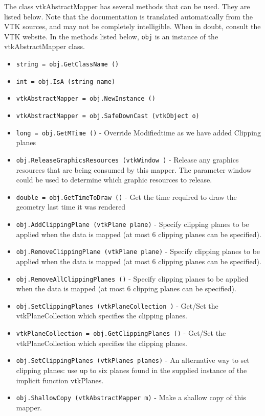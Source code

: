 The class vtkAbstractMapper has several methods that can be used.
  They are listed below.
Note that the documentation is translated automatically from the VTK sources,
and may not be completely intelligible.  When in doubt, consult the VTK website.
In the methods listed below, \verb|obj| is an instance of the vtkAbstractMapper class.
\begin{itemize}
\item  \verb|string = obj.GetClassName ()|

\item  \verb|int = obj.IsA (string name)|

\item  \verb|vtkAbstractMapper = obj.NewInstance ()|

\item  \verb|vtkAbstractMapper = obj.SafeDownCast (vtkObject o)|

\item  \verb|long = obj.GetMTime ()| -  Override Modifiedtime as we have added Clipping planes

\item  \verb|obj.ReleaseGraphicsResources (vtkWindow )| -  Release any graphics resources that are being consumed by this mapper.
 The parameter window could be used to determine which graphic
 resources to release.

\item  \verb|double = obj.GetTimeToDraw ()| -  Get the time required to draw the geometry last time it was rendered

\item  \verb|obj.AddClippingPlane (vtkPlane plane)| -  Specify clipping planes to be applied when the data is mapped
 (at most 6 clipping planes can be specified).

\item  \verb|obj.RemoveClippingPlane (vtkPlane plane)| -  Specify clipping planes to be applied when the data is mapped
 (at most 6 clipping planes can be specified).

\item  \verb|obj.RemoveAllClippingPlanes ()| -  Specify clipping planes to be applied when the data is mapped
 (at most 6 clipping planes can be specified).

\item  \verb|obj.SetClippingPlanes (vtkPlaneCollection )| -  Get/Set the vtkPlaneCollection which specifies the
 clipping planes.

\item  \verb|vtkPlaneCollection = obj.GetClippingPlanes ()| -  Get/Set the vtkPlaneCollection which specifies the
 clipping planes.

\item  \verb|obj.SetClippingPlanes (vtkPlanes planes)| -  An alternative way to set clipping planes: use up to six planes found
 in the supplied instance of the implicit function vtkPlanes.

\item  \verb|obj.ShallowCopy (vtkAbstractMapper m)| -  Make a shallow copy of this mapper.

\end{itemize}
